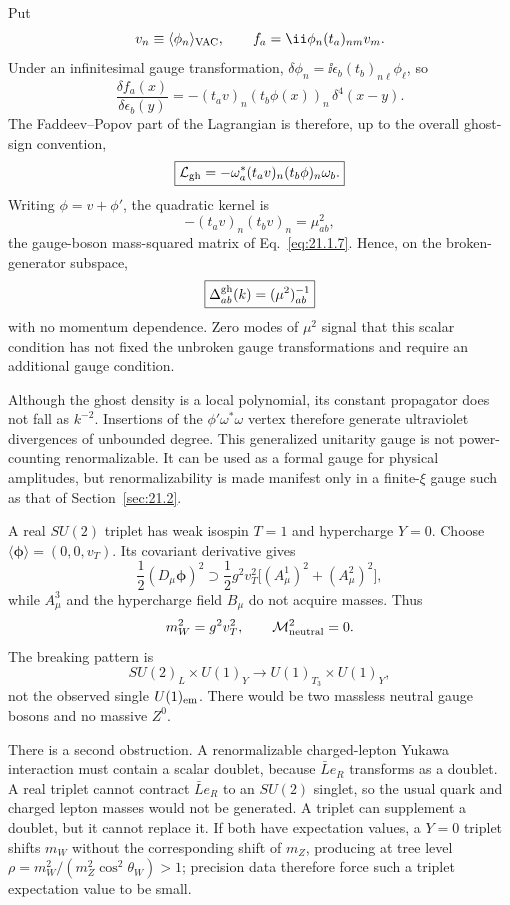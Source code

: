 \ExerciseEditorialNote

\begin{enumerate}
  Put
  \[
    v_n\equiv\langle\phi_n\rangle_{\rm VAC},
    \qquad
    f_a=\ii\phi_n(t_a)_{nm}v_m.
  \]
  Under an infinitesimal gauge transformation,
  \(\delta\phi_n=\ii\epsilon_b(t_b)_{n\ell}\phi_\ell\), so
  \[
    \frac{\delta f_a(x)}{\delta\epsilon_b(y)}
      =-(t_a v)_n(t_b\phi(x))_n\,
        \delta^4(x-y).
  \]
  The Faddeev--Popov part of the Lagrangian is therefore, up to the
  overall ghost-sign convention,
  \[
    \boxed{\mathcal L_{\rm gh}
      =-\omega_a^*(t_a v)_n
        (t_b\phi)_n\omega_b.}
  \]
  Writing \(\phi=v+\phi'\), the quadratic kernel is
  \[
    - (t_a v)_n(t_b v)_n
      =\mu^2_{ab},
  \]
  the gauge-boson mass-squared matrix of
  Eq.~\eqref{eq:21.1.7}.  Hence, on the broken-generator subspace,
  \[
    \boxed{\Delta^{\rm gh}_{ab}(k)
      =(\mu^2)^{-1}_{ab}}
  \]
  with no momentum dependence.  Zero modes of \(\mu^2\) signal that this
  scalar condition has not fixed the unbroken gauge transformations and
  require an additional gauge condition.

  Although the ghost density is a local polynomial, its constant
  propagator does not fall as \(k^{-2}\).  Insertions of the
  \(\phi'\omega^*\omega\) vertex therefore generate ultraviolet
  divergences of unbounded degree.  This generalized unitarity gauge is
  not power-counting renormalizable.  It can be used as a formal gauge
  for physical amplitudes, but renormalizability is made manifest only
  in a finite-\(\xi\) gauge such as that of Section~\ref{sec:21.2}.

  A real \(SU(2)\) triplet has weak isospin \(T=1\) and hypercharge
  \(Y=0\).  Choose
  \(\langle\boldsymbol{\phi}\rangle=(0,0,v_T)\).  Its covariant derivative gives
  \[
    \frac12(D_\mu\boldsymbol{\phi})^2
      \supset\frac12g^2v_T^2
        \bigl[(A_\mu^1)^2+(A_\mu^2)^2\bigr],
  \]
  while \(A_\mu^3\) and the hypercharge field \(B_\mu\) do not acquire
  masses.  Thus
  \[
    m_W^2=g^2v_T^2,\qquad
    \mathcal M^2_{\rm neutral}=0.
  \]
  The breaking pattern is
  \[
    SU(2)_L\times U(1)_Y
      \longrightarrow U(1)_{T_3}\times U(1)_Y,
  \]
  not the observed single \(U(1)_{\rm em}\).  There would be two
  massless neutral gauge bosons and no massive \(Z^0\).

  There is a second obstruction.  A renormalizable charged-lepton
  Yukawa interaction must contain a scalar doublet, because
  \(\bar L e_R\) transforms as a doublet.  A real triplet cannot contract
  \(\bar L e_R\) to an \(SU(2)\) singlet, so the usual quark and charged
  lepton masses would not be generated.  A triplet can supplement a
  doublet, but it cannot replace it.  If both have expectation values,
  a \(Y=0\) triplet shifts \(m_W\) without the corresponding shift of
  \(m_Z\), producing at tree level
  \(\rho=m_W^2/(m_Z^2\cos^2\theta_W)>1\); precision data therefore force
  such a triplet expectation value to be small.


\end{enumerate}
